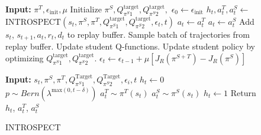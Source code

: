 \documentclass{article} %
\begin{document}
\begin{figure}[tb]
\begin{minipage}[t]{0.52\textwidth}
\begin{algorithm}[H]
    \caption{Dynamically Introspective Action Advising (off-policy)}
    \label{alg:diaa}
    \begin{algorithmic}[1]
    \STATE \textbf{Input:} $\pi^T, \epsilon_{\text{init}}, \mu$
    \STATE Initialize $\pi^S, Q_{\pi^S1}^{\text{target}}, Q_{\pi^S2}^{\text{target}}, $  $ \epsilon_0 \leftarrow \epsilon_\text{init}$  
        \STATE $h_t, a_t^T, a_t^S \leftarrow $ \\ 
        $\text{INTROSPECT}(s_t, \pi^S, \pi^T , Q_{\pi^S1}^{\text{target}}, Q_{\pi^S2}^{\text{target}}, \epsilon_t, t)$
            \STATE $a_t \leftarrow a_t^T$
        \ELSE
            \STATE $a_t \leftarrow a_t^S$
        \ENDIF
    \STATE Add $s_t$, $s_{t+1}, a_t, r_t, d_t$ to replay buffer.
        \STATE Sample batch of trajectories from replay buffer.
        \STATE Update student Q-functions.
        \STATE Update student policy by optimizing $Q_{\pi^S1}^{\text{target}}, Q_{\pi^S2}^{\text{target}}.$
    \ENDFOR
    \STATE $\epsilon_t \leftarrow \epsilon_{t-1} + \mu[J_R(\pi^{S+T}) - J_R(\pi^S)]$
    \ENDFOR
    \end{algorithmic}
\end{algorithm}
\end{minipage}
\hfill
\begin{minipage}[t]{0.45\textwidth}
\begin{algorithm}[H]
    \caption{INTROSPECT}\label{alg:introspect}
    \begin{algorithmic}[1]
    \STATE \textbf{Input:} $s_t, \pi^S, \pi^T, Q_{\pi^S1}^{\text{Target}}, Q_{\pi^S2}^{\text{Target}}, \epsilon_i, t$
    \STATE $h_t\leftarrow0$
    \STATE $p \sim Bern(\lambda^{\text{max}(0,t-\delta)})$
    \STATE $a_t^T \sim \pi^T(s_t)$
    \STATE $a_t^S \sim \pi^S(s_t)$
        \STATE $h_t\leftarrow1$
        \ENDIF
    \ENDIF
    \STATE Return $h_t$, $a_t^T$, $a_t^S$
    \end{algorithmic}
\end{algorithm}
\end{minipage}
\end{figure}
\end{document}
